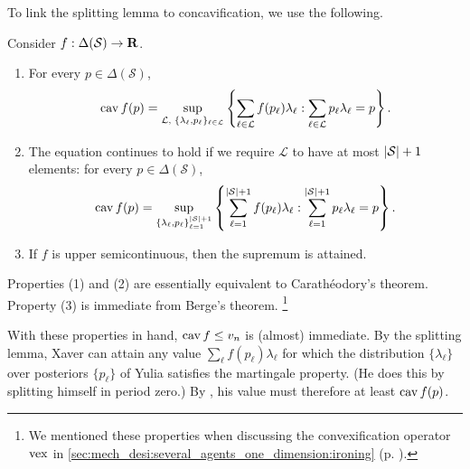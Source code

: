 \documentclass[11pt,letterpaper,reqno,oneside]{article}
\begin{document}
To link the splitting lemma to concavification, we use the following.
%
\begin{lemma}
	\label{lemma:cav_char}
	Consider $f : \Delta(\mathcal{S}) \to \R$.

	\begin{enumerate}

		\item For every $p \in \Delta(\mathcal{S})$,
		\begin{equation*}
			\cav f(p) = \sup_{ \mathcal{L} \text{, }
			\{ \lambda_\ell, p_\ell \}_{\ell \in \mathcal{L}} }
			\left\{
			\sum_{\ell \in \mathcal{L}} f(p_\ell) \lambda_\ell :
			\sum_{\ell \in \mathcal{L}} p_\ell \lambda_\ell = p
			\right\} .
		\end{equation*}
		
		\item The equation continues to hold if we require $\mathcal{L}$ to have at most $\abs*{\mathcal{S}}+1$ elements: for every $p \in \Delta(\mathcal{S})$,
		\begin{equation*}
			\cav f(p) = \sup_{ \{ \lambda_\ell, p_\ell \}_{\ell=1}^{\abs*{\mathcal{S}}+1} }
			\left\{
			\sum_{\ell=1}^{\abs*{\mathcal{S}}+1} f(p_\ell) \lambda_\ell :
			\sum_{\ell=1}^{\abs*{\mathcal{S}}+1} p_\ell \lambda_\ell = p
			\right\} .
		\end{equation*}
		
		\item If $f$ is upper semicontinuous, then the supremum is attained.

	\end{enumerate} 	
\end{lemma}
%
\noindent
Properties (1) and (2) are essentially equivalent to Carathéodory's theorem. Property (3) is immediate from Berge's theorem.%
	\footnote{We mentioned these properties when discussing the convexification operator $\vex$ in \cref{sec:mech_desi:several_agents_one_dimension:ironing} (p. \pageref{sec:mech_desi:several_agents_one_dimension:ironing}).}


With these properties in hand, $\cav f \leq v_n$ is (almost) immediate. By the splitting lemma, Xaver can attain any value $\sum_\ell f(p_\ell) \lambda_\ell$ for which the distribution $\{ \lambda_\ell \}$ over posteriors $\{ p_\ell \}$ of Yulia satisfies the martingale property. (He does this by splitting himself in period zero.) By , his value must therefore at least $\cav f(p)$.
\end{document}
